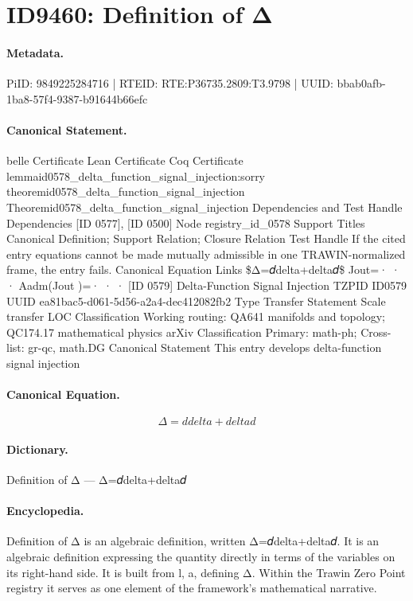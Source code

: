 \section*{ID9460: Definition of Δ}
\paragraph{Metadata.}
PiID: 9849225284716 | RTEID: RTE:P36735.2809:T3.9798 | UUID: bbab0afb-1ba8-57f4-9387-b91644b66efc

\paragraph{Canonical Statement.}
belle Certificate Lean Certificate Coq Certificate lemmaid0578\_delta\_function\_signal\_injection:sorry theoremid0578\_delta\_function\_signal\_injection Theoremid0578\_delta\_function\_signal\_injection Dependencies and Test Handle Dependencies [ID 0577], [ID 0500] Node registry\_id\_0578 Support Titles Canonical Definition; Support Relation; Closure Relation Test Handle If the cited entry equations cannot be made mutually admissible in one TRAWIN-normalized frame, the entry fails. Canonical Equation Links \$Δ=𝑑delta+delta𝑑\$ Jout=· · · Aadm(Jout )=· · · [ID 0579] Delta-Function Signal Injection TZPID ID0579 UUID ea81bac5-d061-5d56-a2a4-dec412082fb2 Type Transfer Statement Scale transfer LOC Classification Working routing: QA641 manifolds and topology; QC174.17 mathematical physics arXiv Classification Primary: math-ph; Cross-list: gr-qc, math.DG Canonical Statement This entry develops delta-function signal injection

\paragraph{Canonical Equation.}
\[
Δ=𝑑delta+delta𝑑
\]

\paragraph{Dictionary.}
Definition of Δ — Δ=𝑑delta+delta𝑑

\paragraph{Encyclopedia.}
Definition of Δ is an algebraic definition, written Δ=𝑑delta+delta𝑑. It is an algebraic definition expressing the quantity directly in terms of the variables on its right-hand side. It is built from l, a, defining Δ. Within the Trawin Zero Point registry it serves as one element of the framework's mathematical narrative.
